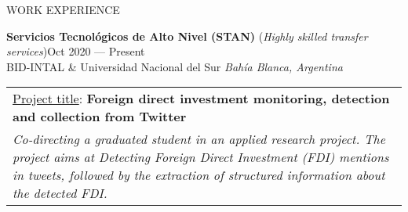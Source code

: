 \documentclass{resume} %
\begin{document}
\begin{rSection}{WORK EXPERIENCE}
\item  \textbf{Servicios Tecnológicos de Alto Nivel (STAN)} (\textit{Highly skilled transfer services})\hfill Oct 2020 --- Present\\\smallskip
BID-INTAL \& Universidad Nacional del Sur \hfill \textit{Bahía Blanca, Argentina}\\
\begin{table}[!ht]
\vspace{-0.7cm}
    \begin{tabular}{|p{\textwidth}}
\underline{Project title}: \textbf{Foreign direct investment monitoring, detection and collection from Twitter}\\
\textit{Co-directing a graduated student in an applied research project. The project aims at Detecting Foreign Direct Investment (FDI) mentions in tweets, followed by the extraction of structured information about the detected FDI. }
    \end{tabular}\vspace{-0.7cm}
\end{table}



\end{rSection}
\smallskip
\end{document}

